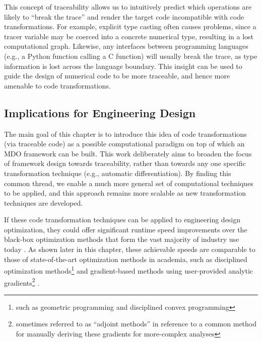 This concept of traceability allows us to intuitively predict which operations are likely to ``break the trace'' and render the target code incompatible with code transformations. For example, explicit type casting often causes problems, since a tracer variable may be coerced into a concrete numerical type, resulting in a lost computational graph. Likewise, any interfaces between programming languages (e.g., a Python function calling a C function) will usually break the trace, as type information is lost across the language boundary. This insight can be used to guide the design of numerical code to be more traceable, and hence more amenable to code transformations.


\subsection{Implications for Engineering Design}

The main goal of this chapter is to introduce this idea of code transformations (via traceable code) as a possible computational paradigm on top of which an MDO framework can be built. This work deliberately aims to broaden the focus of framework design towards traceability, rather than towards any one specific transformation technique (e.g., automatic differentiation). By finding this common thread, we enable a much more general set of computational techniques to be applied, and this approach remains more scalable as new transformation techniques are developed.

If these code transformation techniques can be applied to engineering design optimization, they could offer significant runtime speed improvements over the black-box optimization methods that form the vast majority of industry use today \cite{martins_engineering_2021, lavin_simulation_2022}. As shown later in this chapter, these achievable speeds are comparable to those of state-of-the-art optimization methods in academia, such as disciplined optimization methods\footnote{such as geometric programming and disciplined convex programming} \cite{grant_disciplined_2006, gpkit, boyd_convex_2004, agrawal_disciplined_2019} and gradient-based methods using user-provided analytic gradients\footnote{sometimes referred to as ``adjoint methods'' in reference to a common method for manually deriving these gradients for more-complex analyses} \cite{gray_openmdao_2019, kenway_effective_2019, innes_don_2019}.

